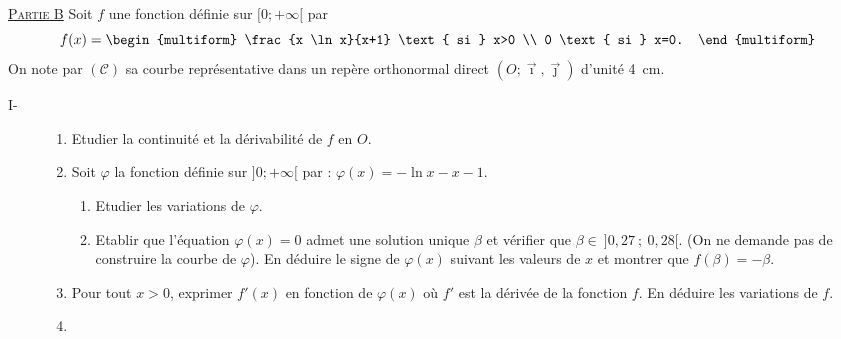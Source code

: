       \noindent \underline{\textsc{Partie B}} \newline
      Soit $f$ une fonction d\'efinie sur $[0 ; +\infty[$ par 
            \begin{displaymath}
                  f(x) = \begin{multiform}
                               \frac{x \ln x}{x+1}  \text{ si }  x>0        \\
                               0                    \text{ si }  x=0.
                         \end{multiform}
            \end{displaymath}
            On note par $(\mathscr{C})$ sa courbe repr\'esentative dans un rep\`ere orthonormal direct 
            $(O ; \vec{\imath} , \vec{\jmath})$ d'unit\'e 4~cm.
            \begin{description}
                  \item[I-] \begin{enumerate}
                              \item Etudier la continuit\'e et la d\'erivabilit\'e de $f$ en $O$.
                              \item Soit $\varphi$ la fonction d\'efinie sur $]0 ; +\infty[$ par : 
                                    $\varphi (x) = - \ln x - x - 1$.
                                    \begin{enumerate}
                                          \item Etudier les variations de $\varphi$.
                                          \item Etablir que l'\'equation $\varphi(x) = 0$ admet une solution unique $\beta$ 
                                                et v\'erifier que $\beta \in\ ]0,27 \ ; \ 0,28[$. 
                                                (On ne demande pas de construire la courbe de $\varphi$).
                                                En d\'eduire le signe de $\varphi (x)$ suivant les valeurs de $x$ et 
                                                montrer que $f(\beta) = -\beta$.
                                    \end{enumerate}
                              \item Pour tout $x>0$, exprimer $f'(x)$ en fonction de $\varphi(x)$ 
                                    o\`u $f'$ est la d\'eriv\'ee de la fonction $f$.
                                    En d\'eduire les variations de $f$.
                              \item \begin{enumerate}

\end{enumerate}
\end{enumerate}
\end{description}
